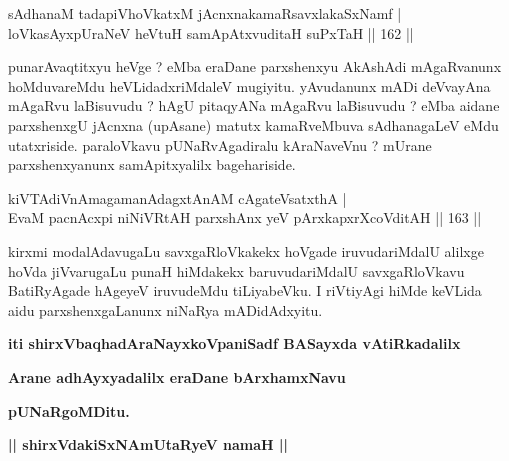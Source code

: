 \begin{shl}
sAdhanaM tadapiVhoVkatxM jAcnxnakamaRsavxlakaSxNamf | \\
loVkasAyxpUraNeV heVtuH samApAtxvuditaH suPxTaH \hfill|| 162 || 
\end{shl}

\begin{artha}
punarAvaqtitxyu heVge ? eMba eraDane parxshenxyu AkAshAdi mAgaRvanunx hoMduvareMdu heVLidadxriMdaleV mugiyitu. yAvudanunx mADi deVvayAna mAgaRvu laBisuvudu ? hAgU pitaqyANa mAgaRvu laBisuvudu ? eMba aidane parxshenxgU jAcnxna (upAsane) matutx kamaRveMbuva sAdhanagaLeV eMdu utatxriside. paraloVkavu pUNaRvAgadiralu kAraNaveVnu ? mUrane parxshenxyanunx samApitxyalilx bagehariside.
\end{artha}


\begin{shl}
kiVTAdiVnAmagamanAdagxtAnAM cA\s \s gateVsatxthA | \\
EvaM pacnAcxpi niNiVRtAH parxshAnx yeV pArxkapxrXcoVditAH \hfill|| 163 || 
\end{shl}

\begin{artha}
kirxmi modalAdavugaLu savxgaRloVkakekx hoVgade iruvudariMdalU alilxge hoVda jiVvarugaLu punaH hiMdakekx baruvudariMdalU savxgaRloVkavu BatiRyAgade hAgeyeV iruvudeMdu tiLiyabeVku. I riVtiyAgi hiMde keVLida aidu parxshenxgaLanunx niNaRya mADidAdxyitu.
\end{artha}


\begin{center}
{\bf iti shirxVbaqhadAraNayxkoVpaniSadf BASayxda vAtiRkadalilx}
\smallskip

{\bf Arane adhAyxyadalilx eraDane bArxhamxNavu}
\smallskip

{\bf pUNaRgoMDitu.}

\smallskip
{\bf || shirxVdakiSxNAmUtaRyeV namaH ||}
\end{center}
